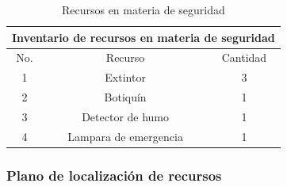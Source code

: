     \begin{table}[H]
        \centering
        \caption{Recursos en materia de seguridad}
        \begin{tabular}{c c c}
        \hline
        \multicolumn{3}{c}{Inventario de recursos en materia de seguridad}\\
        \hline
             No.& Recurso & Cantidad  \\
        \hline
             1& Extintor & 3  \\
        \hline
             2& Botiquín & 1  \\
        \hline
             3& Detector de humo & 1 \\
        \hline
             4& Lampara de emergencia & 1 \\
        \hline     
        \end{tabular}
        \label{tab:inventario}
    \end{table}
    \subsubsection{Plano de localización de recursos}
    
    
